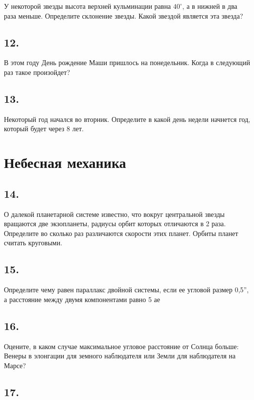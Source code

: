 \documentclass[a4paper,12pt]{article}
\begin{document}
У некоторой звезды высота верхней кульминации равна $40^{\circ}$, а в нижней в два раза меньше. Определите склонение звезды. Какой звездой является эта звезда?

\subsection*{12.} 

В этом году День рождение Маши пришлось на понедельник. Когда в следующий раз такое произойдет?  %

\subsection*{13.} 

Некоторый год начался во вторник. Определите в какой день недели начнется год, который будет через 8 лет.


\section*{Небесная механика}

\subsection*{14.}

О далекой планетарной системе известно, что вокруг центральной звезды вращаются две экзопланеты, радиусы орбит которых отличаются в 2 раза. Определите во сколько раз различаются скорости этих планет. Орбиты планет считать круговыми.

\subsection*{15.}

Определите чему равен параллакс двойной системы, если ее угловой размер 0,5”, а расстояние между двумя компонентами равно 5 ае

\subsection*{16.}

Оцените, в каком случае максимальное угловое расстояние от Солнца больше: Венеры в элонгации для земного наблюдателя или Земли для наблюдателя на Марсе?

\subsection*{17.}
\end{document}
